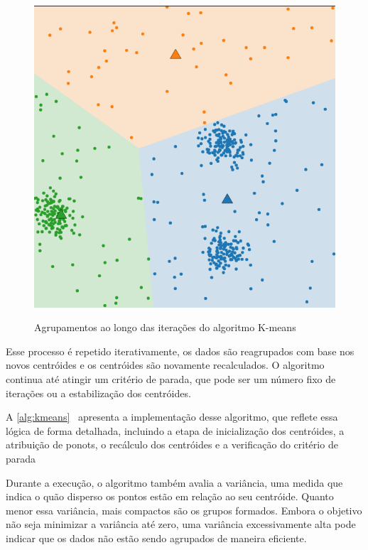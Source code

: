 \begin{figure}[htb]
	\caption{Agrupamentos ao longo das iterações do algoritmo K-means}
	\centering
	\includegraphics[scale=0.7]{figuras/kmeans.png}
	\label{fig:kmeans}
\end{figure}

Esse processo é repetido iterativamente, os dados são reagrupados com base nos novos centróides e os centróides são novamente recalculados. O algoritmo continua até atingir um critério de parada, que pode ser um número fixo de iterações ou a estabilização dos centróides.

A \autoref{alg:kmeans}~\cite{rodinia} apresenta a implementação desse algoritmo, que reflete essa lógica de forma detalhada, incluindo a etapa de inicialização dos centróides, a atribuição de ponots, o recálculo dos centróides e a verificação do critério de parada

Durante a execução, o algoritmo também avalia a variância, uma medida que indica o quão disperso os pontos estão em relação ao seu centróide. Quanto menor essa variância, mais compactos são os grupos formados. Embora o objetivo não seja minimizar a variância até zero, uma variância excessivamente alta pode indicar que os dados não estão sendo agrupados de maneira eficiente.

